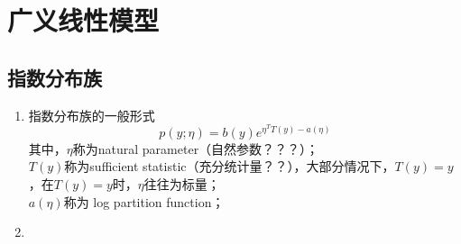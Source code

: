 \section{广义线性模型}
\subsection{指数分布族}
\begin{enumerate}
	\item 指数分布族的一般形式
	\begin{equation}
		p(y;\eta) = b(y)e^{\eta^T T(y) - a(\eta)}
	\end{equation}
	其中，$\eta$称为natural parameter（自然参数？？？）； \\
	$T(y)$称为sufficient statistic（充分统计量？？），大部分情况下，$T(y) = y$，在$T(y)=y$时，$\eta$往往为标量； \\
	$a(\eta)$称为 log partition function；
	\item 
\end{enumerate}

